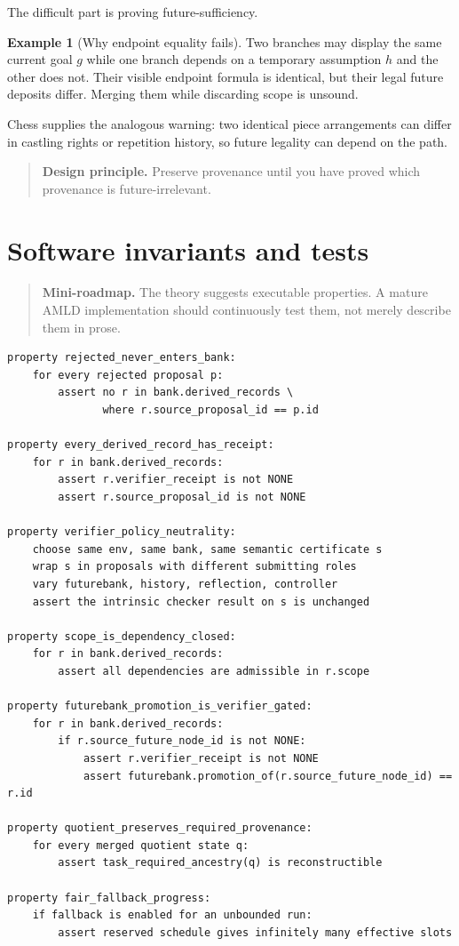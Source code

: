 \documentclass[11pt,openany]{book}
\theoremstyle{definition}
\newtheorem{example}[theorem]{Example}
\theoremstyle{remark}
\newenvironment{miniroadmap}{\begin{quote}\small\color{deepblue}\textbf{Mini-roadmap.} }{\end{quote}}
\newenvironment{designbox}{\begin{quote}\small\color{green!35!black}\textbf{Design principle.} }{\end{quote}}
\begin{document}
The difficult part is proving future-sufficiency.

\begin{example}[Why endpoint equality fails]
Two branches may display the same current goal $g$ while one branch depends on a temporary assumption $h$ and the other does not. Their visible endpoint formula is identical, but their legal future deposits differ. Merging them while discarding scope is unsound.
\end{example}

Chess supplies the analogous warning: two identical piece arrangements can differ in castling rights or repetition history, so future legality can depend on the path.

\begin{designbox}
Preserve provenance until you have proved which provenance is future-irrelevant.
\end{designbox}

\chapter{Software invariants and tests}
\begin{miniroadmap}
The theory suggests executable properties. A mature AMLD implementation should continuously test them, not merely describe them in prose.
\end{miniroadmap}

\begin{lstlisting}[style=pseudo,caption={Core invariant tests}]
property rejected_never_enters_bank:
    for every rejected proposal p:
        assert no r in bank.derived_records \
               where r.source_proposal_id == p.id

property every_derived_record_has_receipt:
    for r in bank.derived_records:
        assert r.verifier_receipt is not NONE
        assert r.source_proposal_id is not NONE

property verifier_policy_neutrality:
    choose same env, same bank, same semantic certificate s
    wrap s in proposals with different submitting roles
    vary futurebank, history, reflection, controller
    assert the intrinsic checker result on s is unchanged

property scope_is_dependency_closed:
    for r in bank.derived_records:
        assert all dependencies are admissible in r.scope

property futurebank_promotion_is_verifier_gated:
    for r in bank.derived_records:
        if r.source_future_node_id is not NONE:
            assert r.verifier_receipt is not NONE
            assert futurebank.promotion_of(r.source_future_node_id) == r.id

property quotient_preserves_required_provenance:
    for every merged quotient state q:
        assert task_required_ancestry(q) is reconstructible

property fair_fallback_progress:
    if fallback is enabled for an unbounded run:
        assert reserved schedule gives infinitely many effective slots
\end{lstlisting}
\end{document}
